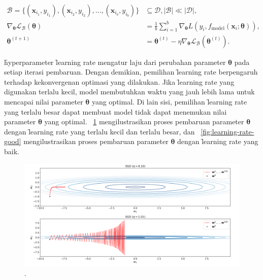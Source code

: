    \begin{align}
        \mathcal{B} = \{(\mathbf{x}_{i_1}, y_{i_1}), (\mathbf{x}_{i_2}, y_{i_2}), \dots, (\mathbf{x}_{i_b}, y_{i_b})\} &\subseteq \mathcal{D}, \mid \mathcal{B} \mid \ll \mid \mathcal{D} \mid, \\
        \label{eq:stochastic-gradient-descent-approx}
        \nabla_{\bm{\theta}}{\mathcal{L_B}}(\bm{\theta}) &= 
         \frac{1}{b} \sum_{i=1}^{b} \nabla_{\bm{\theta}} L(y_{i}, f_{\text{model}}(\mathbf{x}_{i}; \bm{\theta})), \\
        \label{eq:stochastic-gradient-descent}
        \bm{\theta}^{(t+1)} &= \bm{\theta}^{(t)} - \eta \nabla_{\bm{\theta}} \mathcal{L_B}(\bm{\theta}^{(t)}).
    \end{align}



\f{hyperparameter} \f{learning rate} mengatur laju dari perubahan parameter $\bm{\theta}$ pada setiap iterasi pembaruan. Dengan demikian, pemilihan \f{learning rate} berpengaruh terhadap kekonvergenan optimasi yang dilakukan. Jika \f{learning rate} yang digunakan terlalu kecil, model membutuhkan waktu yang jauh lebih lama untuk mencapai nilai parameter $\bm{\theta}$ yang optimal. Di lain sisi, pemilihan \f{learning rate} yang terlalu besar dapat membuat model tidak dapat menemukan nilai parameter $\bm{\theta}$ yang optimal. \pic~\ref{fig:learning-rate-bad} mengilustrasikan proses pembaruan parameter $\bm{\theta}$ dengan \f{learning rate} yang terlalu kecil dan terlalu besar, dan \pic~\ref{fig:learning-rate-good} mengilustrasikan proses pembaruan parameter $\bm{\theta}$ dengan \f{learning rate} yang baik.

\begin{figure}
    \centering
    \includegraphics[width=1\textwidth]{assets/pics/learning-rate-bad.png}
    \caption{\license.}
    \label{fig:learning-rate-bad}
\end{figure}

